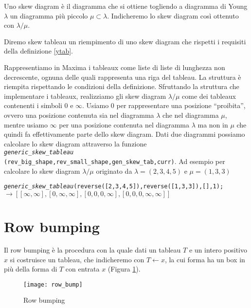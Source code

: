 \begin{defn}
Uno skew diagram \`e il diagramma che si ottiene togliendo a
diagramma di Young $\lambda$ un diagramma pi\`u piccolo $\mu \subset
\lambda$. Indicheremo lo skew diagram cos\`i ottenuto con $\lambda / \mu$.
\end{defn} 

\begin{defn}
Diremo skew tableau un riempimento di uno skew diagram che rispetti i
requisiti della definizione \ref{ytab}. 
\end{defn}

Rappresentiamo in Maxima i tableaux come liste di liste di lunghezza
non decrescente, ognuna delle quali rappresenta una riga del tableau.
La struttura \`e riempita rispettando le condizioni della definizione.
Sfruttando la struttura che implementare i tableaux, realizziamo gli
skew diagram $\lambda/\mu$ come dei tableaux contenenti i simboli $0$ e $\infty$.
Usiamo $0$ per rappresentare una posizione ``proibita'', ovvero una
posizione contenuta sia nel diagramma $\lambda$ che nel diagramma
$\mu$, mentre usiamo $\infty$ per una posizione contenuta nel
diagramma $\lambda$ ma non in $\mu$ che quindi fa effettivamente parte
dello skew diagram. Dati due diagrammi possiamo calcolare lo skew
diagram attraverso la funzione\\
\texttt{\emph{generic\_skew\_tableau} (rev\_big\_shape,rev\_small\_shape,gen\_skew\_tab,curr)}.
Ad esempio per calcolare lo skew diagram $\lambda / \mu$ originato da
$\lambda=(2,3,4,5)$ e $\mu=(1,3,3)$

\begin{alltt}
\emph{generic\_skew\_tableau} (reverse ([2,3,4,5]),reverse ([1,3,3]),[],1);
\(\rightarrow [[\infty,\infty],[0,\infty,\infty],[0,0,0,\infty],[0,0,0,\infty,\infty]]\)
\end{alltt}

\section{Row bumping}\label{rowbump_par}
Il row bumping \`e la procedura con la quale dati un tableau $T$ e un
intero positivo $x$ si costruisce un tableau, che indicheremo con $T
\gets x$, la cui forma ha un box in pi\`u della forma di $T$ con
entrata $x$ (Figura \ref{fig:rowbump}).

\begin{figure}[h]
\centering
\texttt{[image: row\_bump]}
\caption{Row bumping}
\label{fig:rowbump}
\end{figure}

